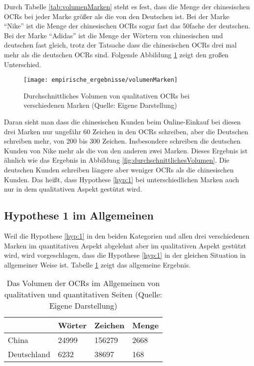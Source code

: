 Durch Tabelle \ref{tab:volumenMarken} steht es fest, dass die Menge der chinesischen \ac{OCRs} bei jeder Marke größer als die von den Deutschen ist. Bei der Marke ``Nike'' ist die Menge der chinesischen \ac{OCRs} sogar fast das 50fache der deutschen. Bei der Marke ``Adidas'' ist die Menge der Wörtern von chinesischen und deutschen fast gleich, trotz der Tatsache dass die chinesischen \ac{OCRs} drei mal mehr als die deutschen \ac{OCRs} sind. Folgende Abbildung \ref{fig:volumenMarken} zeigt den großen Unterschied.
\begin{figure}[htb]
\centering
    \texttt{[image: empirische\_ergebnisse/volumenMarken]} 
    \caption[Durchschnittliches Volumen von qualitativen OCRs bei verschiedenen Marken]{Durchschnittliches Volumen von qualitativen \ac{OCRs} bei verschiedenen Marken (Quelle: Eigene Darstellung)}
    \label{fig:volumenMarken}
\end{figure}

Daran sieht man dass die chinesischen Kunden beim Online-Einkauf bei diesen drei Marken nur ungefähr 60 Zeichen in den \ac{OCRs} schreiben, aber die Deutschen schreiben mehr, von 200 bis 300 Zeichen. Insbesondere schreiben die deutschen Kunden von Nike mehr als die von den anderen zwei Marken. Dieses Ergebnis ist ähnlich wie das Ergebnis in Abbildung \ref{fig:durchschnittlichesVolumen}. Die deutschen Kunden schreiben längere aber weniger \ac{OCRs} als die chinesischen Kunden. Das heißt, dass Hypothese \ref{hyp:1} bei unterschiedlichen Marken auch nur in dem qualitativen Aspekt gestützt wird. 
\subsection{Hypothese 1 im Allgemeinen}
Weil die Hypothese \ref{hyp:1} in den beiden Kategorien und allen drei verschiedenen Marken im quantitativen Aspekt abgelehnt aber im qualitativen Aspekt gestützt wird, wird vorgeschlagen, dass die Hypothese \ref{hyp:1} in der gleichen Situation in allgemeiner Weise ist. Tabelle \ref{tab:volumenAllgemeinen} zeigt das allgemeine Ergebnis.
\begin{table}[htb]
\centering
\begin{tabular}{|l|l|l|l|}
\hline
            & Wörter & Zeichen & Menge \\ \hline
China       & 24999 & 156279  & 2668   \\ \hline
Deutschland & 6232   & 38697   & 168    \\ \hline
\end{tabular}
\caption[Das Volumen der OCRs im Allgemeinen von qualitativen und quantitativen Seiten]{Das Volumen der \ac{OCRs} im Allgemeinen von qualitativen und quantitativen Seiten (Quelle: Eigene Darstellung)}
\label{tab:volumenAllgemeinen}
\end{table}

